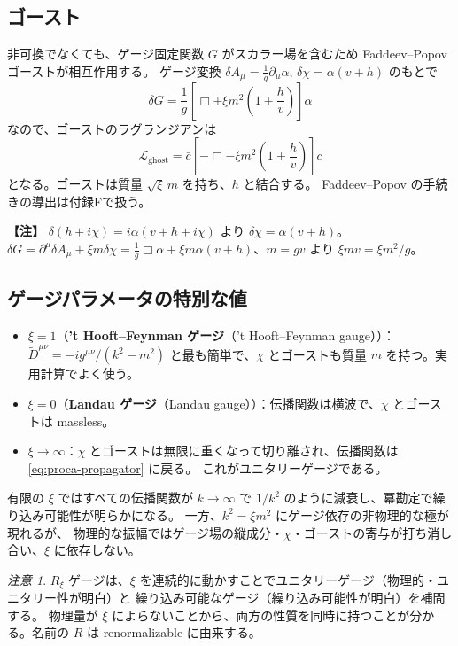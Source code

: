 \documentclass[uplatex,dvipdfmx,a4paper,11pt,openany]{jsbook}
\newcommand{\term}[2]{\textbf{#1}（#2）}
\newenvironment{note}{\vspace{1ex}\par\footnotesize\noindent\textbf{【注】}}{\par\vspace{1ex}}
\numberwithin{equation}{chapter}
\theoremstyle{definition}
\theoremstyle{plain}
\theoremstyle{remark}
\newtheorem{remark}{注意}[chapter]
\newcommand{\Lag}{\mathcal{L}}
\begin{document}
\subsection{ゴースト}
非可換でなくても、ゲージ固定関数 $G$ がスカラー場を含むため Faddeev--Popov ゴーストが相互作用する。
ゲージ変換 $\delta A_\mu=\frac1g\partial_\mu\alpha$, $\delta\chi=\alpha(v+h)$ のもとで
\begin{equation}
\delta G=\frac1g\left[\Box+\xi m^2\left(1+\frac hv\right)\right]\alpha
\end{equation}
なので、ゴーストのラグランジアンは
\begin{equation}
\Lag_{\mathrm{ghost}}=\bar c\left[-\Box-\xi m^2\left(1+\frac hv\right)\right]c
\end{equation}
となる。ゴーストは質量 $\sqrt\xi\,m$ を持ち、$h$ と結合する。
Faddeev--Popov の手続きの導出は付録Fで扱う。
\begin{note}
$\delta(h+i\chi)=i\alpha(v+h+i\chi)$ より $\delta\chi=\alpha(v+h)$。
$\delta G=\partial^\mu\delta A_\mu+\xi m\delta\chi=\frac1g\Box\alpha+\xi m\alpha(v+h)$、$m=gv$ より $\xi m v=\xi m^2/g$。
\end{note}
\subsection{ゲージパラメータの特別な値}
\begin{itemize}
    \item $\xi=1$（\term{'t Hooft--Feynman ゲージ}{'t Hooft--Feynman gauge}）：
    $\tilde D^{\mu\nu}=-ig^{\mu\nu}/(k^2-m^2)$ と最も簡単で、$\chi$ とゴーストも質量 $m$ を持つ。実用計算でよく使う。
    \item $\xi=0$（\term{Landau ゲージ}{Landau gauge}）：伝播関数は横波で、$\chi$ とゴーストは massless。
    \item $\xi\to\infty$：$\chi$ とゴーストは無限に重くなって切り離され、伝播関数は \eqref{eq:proca-propagator} に戻る。
    これがユニタリーゲージである。
\end{itemize}
有限の $\xi$ ではすべての伝播関数が $k\to\infty$ で $1/k^2$ のように減衰し、冪勘定で繰り込み可能性が明らかになる。
一方、$k^2=\xi m^2$ にゲージ依存の非物理的な極が現れるが、
物理的な振幅ではゲージ場の縦成分・$\chi$・ゴーストの寄与が打ち消し合い、$\xi$ に依存しない。
\begin{remark}
$R_\xi$ ゲージは、$\xi$ を連続的に動かすことでユニタリーゲージ（物理的・ユニタリー性が明白）と
繰り込み可能なゲージ（繰り込み可能性が明白）を補間する。
物理量が $\xi$ によらないことから、両方の性質を同時に持つことが分かる。名前の $R$ は renormalizable に由来する。
\end{remark}
\end{document}
